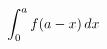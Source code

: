 \documentclass[preview]{standalone}
\begin{document}
\begin{align*}
\special{dvisvgm:raw <g id='unique000'>}\int_0^a f(a-x)\,dx\special{dvisvgm:raw </g>}
\end{align*}
\end{document}
